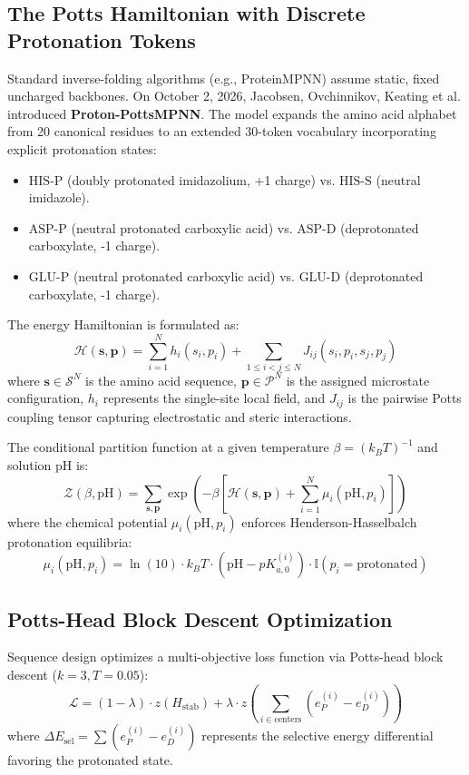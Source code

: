 \documentclass[11pt]{article}
\begin{document}
\subsection{The Potts Hamiltonian with Discrete Protonation Tokens}
Standard inverse-folding algorithms (e.g., ProteinMPNN) assume static, fixed uncharged backbones. On October 2, 2026, Jacobsen, Ovchinnikov, Keating et al. introduced \textbf{Proton-PottsMPNN}. The model expands the amino acid alphabet from 20 canonical residues to an extended 30-token vocabulary incorporating explicit protonation states:
\begin{itemize}
    \item $\text{HIS-P}$ (doubly protonated imidazolium, +1 charge) vs. $\text{HIS-S}$ (neutral imidazole).
    \item $\text{ASP-P}$ (neutral protonated carboxylic acid) vs. $\text{ASP-D}$ (deprotonated carboxylate, -1 charge).
    \item $\text{GLU-P}$ (neutral protonated carboxylic acid) vs. $\text{GLU-D}$ (deprotonated carboxylate, -1 charge).
\end{itemize}

The energy Hamiltonian is formulated as:
\begin{equation}
    \mathcal{H}(\mathbf{s}, \mathbf{p}) = \sum_{i=1}^N h_i(s_i, p_i) + \sum_{1 \le i < j \le N} J_{ij}(s_i, p_i, s_j, p_j)
\end{equation}
where $\mathbf{s} \in \mathcal{S}^N$ is the amino acid sequence, $\mathbf{p} \in \mathcal{P}^N$ is the assigned microstate configuration, $h_i$ represents the single-site local field, and $J_{ij}$ is the pairwise Potts coupling tensor capturing electrostatic and steric interactions.

The conditional partition function at a given temperature $\beta = (k_B T)^{-1}$ and solution pH is:
\begin{equation}
    \mathcal{Z}(\beta, \text{pH}) = \sum_{\mathbf{s}, \mathbf{p}} \exp\left(-\beta \left[\mathcal{H}(\mathbf{s}, \mathbf{p}) + \sum_{i=1}^N \mu_i(\text{pH}, p_i)\right]\right)
\end{equation}
where the chemical potential $\mu_i(\text{pH}, p_i)$ enforces Henderson-Hasselbalch protonation equilibria:
\begin{equation}
    \mu_i(\text{pH}, p_i) = \ln(10) \cdot k_B T \cdot (\text{pH} - pK_{a,0}^{(i)}) \cdot \mathbb{I}(p_i = \text{protonated})
\end{equation}

\subsection{Potts-Head Block Descent Optimization}
Sequence design optimizes a multi-objective loss function via Potts-head block descent ($k=3, T=0.05$):
\begin{equation}
    \mathcal{L} = (1 - \lambda) \cdot z(H_{\text{stab}}) + \lambda \cdot z\left(\sum_{i \in \text{centers}} (e_P^{(i)} - e_D^{(i)})\right)
\end{equation}
where $\Delta E_{\text{sel}} = \sum (e_P^{(i)} - e_D^{(i)})$ represents the selective energy differential favoring the protonated state.
\end{document}
